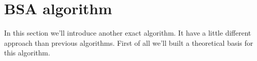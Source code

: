 
\section{BSA algorithm}
In this section we'll introduce another exact algorithm. It have a little different approach than previous algorithms. First of all we'll built a theoretical basis for this algorithm.







